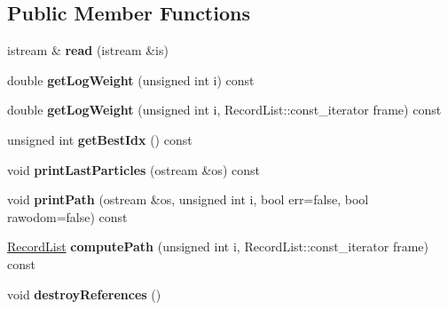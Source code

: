\subsection*{Public Member Functions}
\begin{DoxyCompactItemize}
\item 
\mbox{\label{structGMapping_1_1GFSReader_1_1RecordList_a863eefcb0eef4c3fae174a789da4e555}} 
istream \& {\bfseries read} (istream \&is)
\item 
\mbox{\label{structGMapping_1_1GFSReader_1_1RecordList_ac5a7c67f0500967a2d2d66aa9ace7ce3}} 
double {\bfseries get\+Log\+Weight} (unsigned int i) const
\item 
\mbox{\label{structGMapping_1_1GFSReader_1_1RecordList_a505390e99d2f82d3494f56c4751fce9b}} 
double {\bfseries get\+Log\+Weight} (unsigned int i, Record\+List\+::const\+\_\+iterator frame) const
\item 
\mbox{\label{structGMapping_1_1GFSReader_1_1RecordList_a6585fcf4df6458b85694dd2c23840f1e}} 
unsigned int {\bfseries get\+Best\+Idx} () const
\item 
\mbox{\label{structGMapping_1_1GFSReader_1_1RecordList_ad854c4c53612a1b297404a131c7081e2}} 
void {\bfseries print\+Last\+Particles} (ostream \&os) const
\item 
\mbox{\label{structGMapping_1_1GFSReader_1_1RecordList_a9d6c3054bb46e177d64aadc2f1c8f0a9}} 
void {\bfseries print\+Path} (ostream \&os, unsigned int i, bool err=false, bool rawodom=false) const
\item 
\mbox{\label{structGMapping_1_1GFSReader_1_1RecordList_ac1671aeba3a26bfdb7af750821095c6c}} 
\hyperlink{structGMapping_1_1GFSReader_1_1RecordList}{Record\+List} {\bfseries compute\+Path} (unsigned int i, Record\+List\+::const\+\_\+iterator frame) const
\item 
\mbox{\label{structGMapping_1_1GFSReader_1_1RecordList_ae28ffc13045f04b582ab3446a5e4a45c}} 
void {\bfseries destroy\+References} ()
\end{DoxyCompactItemize}
